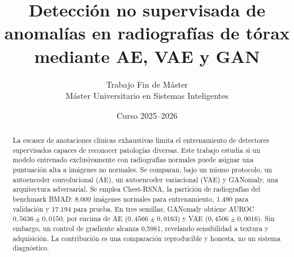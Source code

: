 \documentclass[10pt,a4paper]{article}
\title{Detección no supervisada de anomalías en radiografías de tórax\\mediante AE, VAE y GAN}
\author{Trabajo Fin de Máster\\Máster Universitario en Sistemas Inteligentes}
\date{Curso 2025--2026}
\begin{document}
\maketitle

\begin{abstract}
La escasez de anotaciones clínicas exhaustivas limita el entrenamiento de
detectores supervisados capaces de reconocer patologías diversas. Este trabajo
estudia si un modelo entrenado exclusivamente con radiografías normales puede
asignar una puntuación alta a imágenes no normales. Se comparan, bajo un mismo
protocolo, un autoencoder convolucional (AE), un autoencoder variacional (VAE) y
GANomaly, una arquitectura adversarial. Se emplea Chest-RSNA, la partición de
radiografías del benchmark BMAD: 8.000 imágenes normales para entrenamiento,
1.490 para validación y 17.194 para prueba. En tres semillas, GANomaly obtiene
AUROC $0{,}5636\pm0{,}0150$, por encima de AE ($0{,}4566\pm0{,}0163$) y VAE
($0{,}4506\pm0{,}0016$). Sin embargo, un control de gradiente alcanza 0,5981,
revelando sensibilidad a textura y adquisición. La contribución es una
comparación reproducible y honesta, no un sistema diagnóstico.
\end{abstract}








\printbibliography[title={Bibliografía}]
\end{document}
